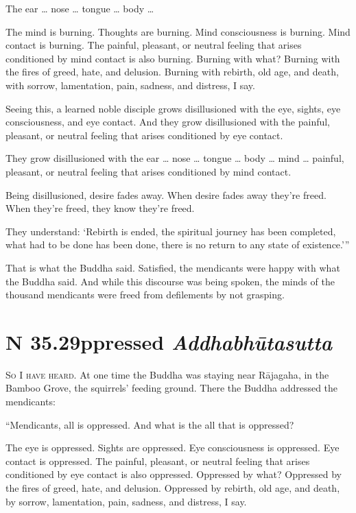 \documentclass[12pt,openany]{book}%
\newcommand*{\suttatitleacronym}[1]{\smaller[2]{#1}\vspace*{.3em}}
\newcommand*{\suttatitletranslation}[1]{\linebreak{#1}}
\newcommand*{\suttatitleroot}[1]{\linebreak\smaller[2]\itshape{#1}}
\newcommand*{\tocacronym}[1]{\hspace*{-3.3em}{#1}\quad}
\newcommand*{\toctranslation}[1]{#1}
\newcommand*{\tocroot}[1]{(\textit{#1})}
\newcommand*{\scevam}[1]{\textsc{#1}}
\begin{document}
The ear … nose … tongue … body … 

The mind is burning. Thoughts are burning. Mind consciousness is burning. Mind contact is burning. The painful, pleasant, or neutral feeling that arises conditioned by mind contact is also burning. Burning with what? Burning with the fires of greed, hate, and delusion. Burning with rebirth, old age, and death, with sorrow, lamentation, pain, sadness, and distress, I say. 

Seeing this, a learned noble disciple grows disillusioned with the eye, sights, eye consciousness, and eye contact. And they grow disillusioned with the painful, pleasant, or neutral feeling that arises conditioned by eye contact. 

They grow disillusioned with the ear … nose … tongue … body … mind … painful, pleasant, or neutral feeling that arises conditioned by mind contact. 

Being disillusioned, desire fades away. When desire fades away they’re freed. When they’re freed, they know they’re freed. 

They understand: ‘Rebirth is ended, the spiritual journey has been completed, what had to be done has been done, there is no return to any state of existence.’” 

That is what the Buddha said. Satisfied, the mendicants were happy with what the Buddha said. And while this discourse was being spoken, the minds of the thousand mendicants were freed from defilements by not grasping. 

%
\section*{{\suttatitleacronym SN 35.29}{\suttatitletranslation Oppressed }{\suttatitleroot Addhabhūtasutta}}
\addcontentsline{toc}{section}{\tocacronym{SN 35.29} \toctranslation{Oppressed } \tocroot{Addhabhūtasutta}}

\scevam{So I have heard. }At one time the Buddha was staying near \textsanskrit{Rājagaha}, in the Bamboo Grove, the squirrels’ feeding ground. There the Buddha addressed the mendicants: 

“Mendicants, all is oppressed. And what is the all that is oppressed? 

The eye is oppressed. Sights are oppressed. Eye consciousness is oppressed. Eye contact is oppressed. The painful, pleasant, or neutral feeling that arises conditioned by eye contact is also oppressed. Oppressed by what? Oppressed by the fires of greed, hate, and delusion. Oppressed by rebirth, old age, and death, by sorrow, lamentation, pain, sadness, and distress, I say. 
\end{document}
